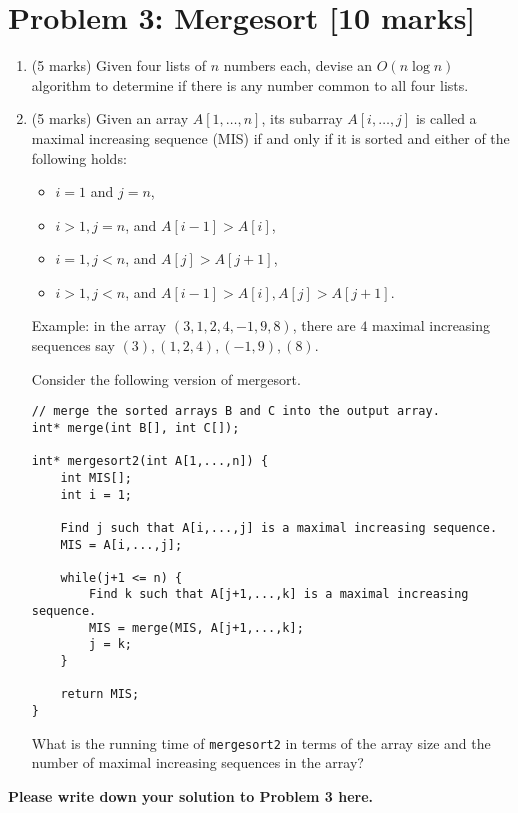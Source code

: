 \documentclass[11pt,twoside]{article}
\newcommand{\problem}[1]{\section*{Problem #1}}
\newenvironment{solution}{{\par\noindent\it Solution.}}{}
\begin{document}
\problem{3: Mergesort [10 marks]} 
		\begin{enumerate}
			\item (5 marks) Given four lists of $n$ numbers each, devise an $O(n\log n)$ algorithm to determine if there is any number common to all four lists.
			\item (5 marks) Given an array $A[1,\dots,n]$, its subarray $A[i,\dots,j]$ is called a maximal increasing sequence (MIS) if and only if it is sorted and either of the following holds:
			\begin{itemize}
			    \item $i=1$ and $j=n$,
			    \item $i> 1, j = n$, and $A[i-1]> A[i]$,
			    \item $i=1, j< n$, and $A[j]>A[j+1]$,
			    \item $i>1, j<n$, and $A[i-1]> A[i], A[j]>A[j+1]$.
			\end{itemize}
			Example: in the array $(3,1,2,4,-1,9,8)$, there are $4$ maximal increasing sequences say $(3), (1,2,4), (-1,9), (8)$.
			
			Consider the following version of mergesort. 
\begin{lstlisting}
// merge the sorted arrays B and C into the output array.
int* merge(int B[], int C[]);

int* mergesort2(int A[1,...,n]) { 
    int MIS[];
    int i = 1;
    
    Find j such that A[i,...,j] is a maximal increasing sequence.
    MIS = A[i,...,j];
    
    while(j+1 <= n) {
        Find k such that A[j+1,...,k] is a maximal increasing sequence.
        MIS = merge(MIS, A[j+1,...,k];
        j = k;
    }
    
    return MIS;
}
\end{lstlisting}
		What is the running time of \texttt{mergesort2} in terms of the array size and the number of maximal increasing sequences in the array?
\end{enumerate}
\begin{solution}
\textbf{Please write down your solution to Problem 3 here.}
\end{solution}
		
\end{document}
